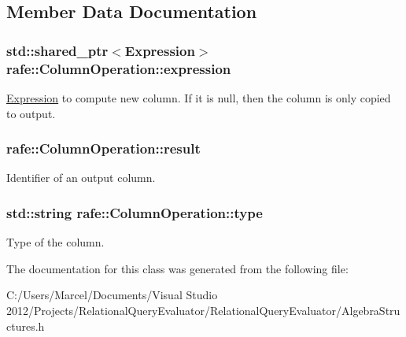 \subsection{Member Data Documentation}
\hypertarget{classrafe_1_1_column_operation_a33bfeb4554709f96d9945cb2148f095b}{
\subsubsection[{expression}]{\setlength{\rightskip}{0pt plus 5cm}std\+::shared\+\_\+ptr$<${\bf Expression}$>$ rafe\+::\+Column\+Operation\+::expression}}\label{classrafe_1_1_column_operation_a33bfeb4554709f96d9945cb2148f095b}
\hyperlink{classrafe_1_1_expression}{Expression} to compute new column. If it is null, then the column is only copied to output. \hypertarget{classrafe_1_1_column_operation_a728c264bef7363a5bf0578c49654ea3b}{
\subsubsection[{result}]{ rafe\+::\+Column\+Operation\+::result}}\label{classrafe_1_1_column_operation_a728c264bef7363a5bf0578c49654ea3b}
Identifier of an output column. \hypertarget{classrafe_1_1_column_operation_a1c85fd1a1f9465b33553cbdd6e641a51}{
\subsubsection[{type}]{\setlength{\rightskip}{0pt plus 5cm}std\+::string rafe\+::\+Column\+Operation\+::type}}\label{classrafe_1_1_column_operation_a1c85fd1a1f9465b33553cbdd6e641a51}
Type of the column. 

The documentation for this class was generated from the following file\+:\begin{DoxyCompactItemize}
\item 
C\+:/\+Users/\+Marcel/\+Documents/\+Visual Studio 2012/\+Projects/\+Relational\+Query\+Evaluator/\+Relational\+Query\+Evaluator/Algebra\+Structures.\+h\end{DoxyCompactItemize}

